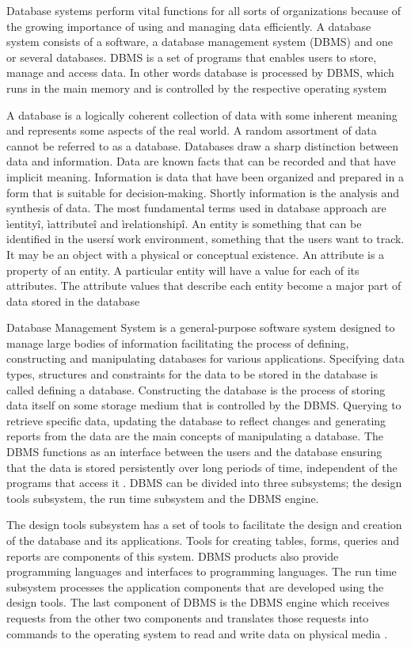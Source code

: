 Database systems perform vital functions for all sorts of organizations
because of the growing importance of using and managing data efficiently. A
database system consists of a software, a database management system (DBMS)
and one or several databases. DBMS is a set of programs that enables users to
store, manage and access data. In other words database is processed by DBMS,
which runs in the main memory and is controlled by the respective operating
system

A database is a logically coherent collection of data with some inherent
meaning and represents some aspects of the real world. A random assortment of
data cannot be referred to as a database. Databases draw a sharp distinction
between data and information. Data are known facts that can be recorded and that
have implicit meaning. Information is data that have been organized and prepared
in a form that is suitable for decision-making. Shortly information is the analysis
and synthesis of data.
The most fundamental terms used in database approach are ìentityî,
ìattributeî and ìrelationshipî. An entity is something that can be identified in the
usersí work environment, something that the users want to track. It may be an
object with a physical or conceptual existence. An attribute is a property of an
entity. A particular entity will have a value for each of its attributes. The attribute
values that describe each entity become a major part of data stored in the database 

Database Management System is a general-purpose software system
designed to manage large bodies of information facilitating the process of
defining, constructing and manipulating databases for various applications.
Specifying data types, structures and constraints for the data to be stored in the
database is called defining a database. Constructing the database is the process of
storing data itself on some storage medium that is controlled by the DBMS.
Querying to retrieve specific data, updating the database to reflect changes and
generating reports from the data are the main concepts of manipulating a database.
The DBMS functions as an interface between the users and the database
ensuring that the data is stored persistently over long periods of time, independent
of the programs that access it \cite{latisen1998}.
DBMS can be divided into three subsystems; the design tools subsystem,
the run time subsystem and the DBMS engine. 

The design tools subsystem has a set of tools to facilitate the design and
creation of the database and its applications. Tools for creating tables, forms,
queries and reports are components of this system. DBMS products also provide
programming languages and interfaces to programming languages. The run time
subsystem processes the application components that are developed using the
design tools. The last component of DBMS is the DBMS engine which receives
requests from the other two components and translates those requests into
commands to the operating system to read and write data on physical media \cite{elmasri1998}.

